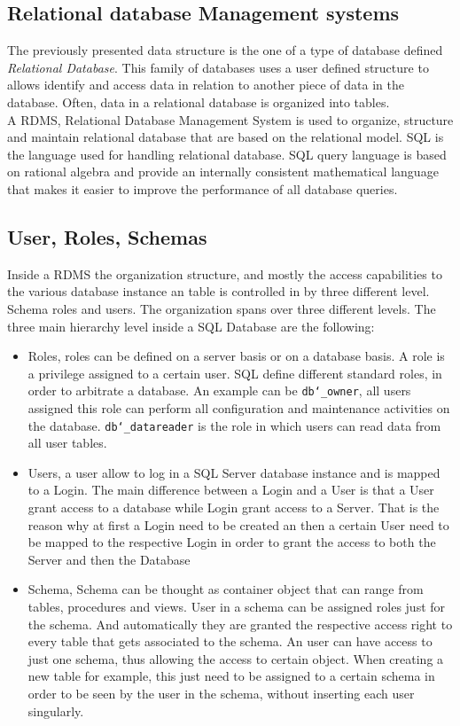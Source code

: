 \documentclass[../main.tex]{subfiles}
\begin{document}
\subsection{Relational database Management systems}
The previously presented data structure is the one of a type of database defined \textit{Relational Database}. This family of databases uses a user defined structure to allows identify and access data in relation to another piece of data in the database. Often, data in a relational database is organized into tables.\\ A \gls{RDMS}, Relational Database Management System is used to organize, structure and maintain relational database that are based on the relational model. \gls{SQL} is the language used for handling relational database. \gls{SQL} query language is based on rational algebra and provide an internally consistent mathematical language that makes it easier to improve the performance of all database queries.
\subsection{User, Roles, Schemas}
Inside a \gls{RDMS} the organization structure, and mostly the access capabilities to the various database instance an table is controlled in by three different level. Schema roles and users. The organization spans over three different levels. The three main hierarchy level inside a \gls{SQL} Database are the following:
\begin{itemize}
    \item Roles, roles can be defined on a server basis or on a database basis. A role is a privilege assigned to a certain user. \gls{SQL} define different standard roles, in order to arbitrate a database. An example can be \texttt{db\char`_owner}, all users assigned this role can perform all configuration and maintenance activities on the database. \texttt{db\char`_datareader} is the role in which users can read data from all user tables. 
    \item Users, a user allow to log in a SQL Server database instance and is mapped to a Login. The main difference between a Login and a User is that a User grant access to a database while Login grant access to a Server. That is the reason why at first a Login need to be created an then a certain User need to be mapped to the respective Login in order to grant the access to both the Server and then the Database
    \item Schema, Schema can be thought as container object that can range from tables, procedures and views. User in a schema can be assigned roles just for the schema. And automatically they are granted the respective access right to every table that gets associated to the schema. An user can have access to just one schema, thus allowing the access to certain object. When creating a new table for example, this just need to be assigned to a certain schema in order to be seen by the user in the schema, without inserting each user singularly. 
\end{itemize}
\end{document}
